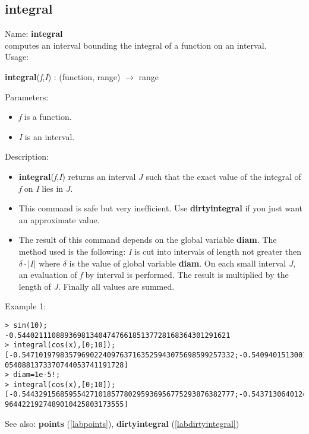 \subsection{integral}
\label{labintegral}
\noindent Name: \textbf{integral}\\
computes an interval bounding the integral of a function on an interval.\\

\noindent Usage: 
\begin{center}
\textbf{integral}(\emph{f},\emph{I}) : (\textsf{function}, \textsf{range}) $\rightarrow$ \textsf{range}\\
\end{center}
Parameters: 
\begin{itemize}
\item \emph{f} is a function.
\item \emph{I} is an interval.
\end{itemize}
\noindent Description: \begin{itemize}

\item \textbf{integral}(\emph{f},\emph{I}) returns an interval $J$ such that the exact value of 
   the integral of \emph{f} on \emph{I} lies in $J$.

\item This command is safe but very inefficient. Use \textbf{dirtyintegral} if you just want
   an approximate value.

\item The result of this command depends on the global variable \textbf{diam}.
   The method used is the following: \emph{I} is cut into intervals of length not 
   greater then $\delta \cdot |I|$ where $\delta$ is the value
   of global variable \textbf{diam}.
   On each small interval \emph{J}, an evaluation of \emph{f} by interval is
   performed. The result is multiplied by the length of \emph{J}. Finally all values 
   are summed.
\end{itemize}
\noindent Example 1: 
\begin{center}\begin{minipage}{15cm}\begin{Verbatim}[frame=single]
> sin(10);
-0.54402111088936981340474766185137728168364301291621
> integral(cos(x),[0;10]);
[-0.54710197983579690224097637163525943075698599257332;-0.5409401513001318384815
0540881373370744053741191728]
> diam=1e-5!;
> integral(cos(x),[0;10]);
[-0.54432915685955427101857780295936956775293876382777;-0.5437130640124996950803
9644221927489010425803173555]
\end{Verbatim}
\end{minipage}\end{center}
See also: \textbf{points} (\ref{labpoints}), \textbf{dirtyintegral} (\ref{labdirtyintegral})
